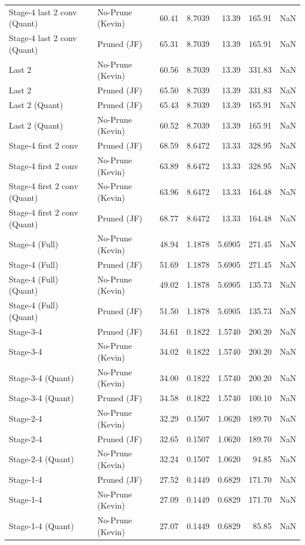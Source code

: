 \begin{table}
\begin{tabular}{llrrrrl}
Stage-4 last 2 conv
(Quant) & No-Prune (Kevin) & 60.41 & 8.7039 & 13.39 & 165.91 & NaN \\
Stage-4 last 2 conv
(Quant) & Pruned (JF) & 65.31 & 8.7039 & 13.39 & 165.91 & NaN \\
Last 2 & No-Prune (Kevin) & 60.56 & 8.7039 & 13.39 & 331.83 & NaN \\
Last 2 & Pruned (JF) & 65.50 & 8.7039 & 13.39 & 331.83 & NaN \\
Last 2
(Quant) & Pruned (JF) & 65.43 & 8.7039 & 13.39 & 165.91 & NaN \\
Last 2
(Quant) & No-Prune (Kevin) & 60.52 & 8.7039 & 13.39 & 165.91 & NaN \\
Stage-4 first 2 conv & Pruned (JF) & 68.59 & 8.6472 & 13.33 & 328.95 & NaN \\
Stage-4 first 2 conv & No-Prune (Kevin) & 63.89 & 8.6472 & 13.33 & 328.95 & NaN \\
Stage-4 first 2 conv
(Quant) & No-Prune (Kevin) & 63.96 & 8.6472 & 13.33 & 164.48 & NaN \\
Stage-4 first 2 conv
(Quant) & Pruned (JF) & 68.77 & 8.6472 & 13.33 & 164.48 & NaN \\
Stage-4 (Full) & No-Prune (Kevin) & 48.94 & 1.1878 & 5.6905 & 271.45 & NaN \\
Stage-4 (Full) & Pruned (JF) & 51.69 & 1.1878 & 5.6905 & 271.45 & NaN \\
Stage-4 (Full)
(Quant) & No-Prune (Kevin) & 49.02 & 1.1878 & 5.6905 & 135.73 & NaN \\
Stage-4 (Full)
(Quant) & Pruned (JF) & 51.50 & 1.1878 & 5.6905 & 135.73 & NaN \\
Stage-3-4 & Pruned (JF) & 34.61 & 0.1822 & 1.5740 & 200.20 & NaN \\
Stage-3-4 & No-Prune (Kevin) & 34.02 & 0.1822 & 1.5740 & 200.20 & NaN \\
Stage-3-4
(Quant) & No-Prune (Kevin) & 34.00 & 0.1822 & 1.5740 & 200.20 & NaN \\
Stage-3-4
(Quant) & Pruned (JF) & 34.58 & 0.1822 & 1.5740 & 100.10 & NaN \\
Stage-2-4 & No-Prune (Kevin) & 32.29 & 0.1507 & 1.0620 & 189.70 & NaN \\
Stage-2-4 & Pruned (JF) & 32.65 & 0.1507 & 1.0620 & 189.70 & NaN \\
Stage-2-4
(Quant) & No-Prune (Kevin) & 32.24 & 0.1507 & 1.0620 & 94.85 & NaN \\
Stage-1-4 & Pruned (JF) & 27.52 & 0.1449 & 0.6829 & 171.70 & NaN \\
Stage-1-4 & No-Prune (Kevin) & 27.09 & 0.1449 & 0.6829 & 171.70 & NaN \\
Stage-1-4
(Quant) & No-Prune (Kevin) & 27.07 & 0.1449 & 0.6829 & 85.85 & NaN \\
\bottomrule
\end{tabular}
\end{table}
